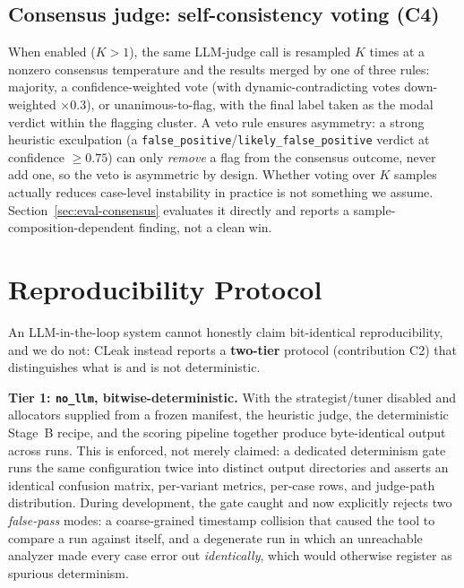 \documentclass[11pt,a4paper]{article}
\begin{document}
\subsection{Consensus judge: self-consistency voting (C4)}

When enabled ($K>1$), the same LLM-judge call is resampled $K$ times at a
nonzero consensus temperature and the results merged by one of three rules:
majority, a confidence-weighted vote (with dynamic-contradicting votes
down-weighted $\times 0.3$), or unanimous-to-flag, with the final label
taken as the modal verdict within the flagging cluster. A veto rule
ensures asymmetry: a strong heuristic exculpation (a
\texttt{false\_positive}/\texttt{likely\_false\_positive} verdict at
confidence $\geq 0.75$) can only \emph{remove} a flag from the consensus
outcome, never add one, so the veto is asymmetric by design. Whether
voting over $K$ samples actually reduces case-level instability in
practice is not something we assume. Section~\ref{sec:eval-consensus}
evaluates it directly and reports a sample-composition-dependent finding,
not a clean win.

\section{Reproducibility Protocol}
\label{sec:reproducibility}

An LLM-in-the-loop system cannot honestly claim bit-identical
reproducibility, and we do not: CLeak instead reports a
\textbf{two-tier} protocol (contribution C2) that distinguishes what is
and is not deterministic.

\textbf{Tier 1: \texttt{no\_llm}, bitwise-deterministic.} With the
strategist/tuner disabled and allocators supplied from a frozen manifest,
the heuristic judge, the deterministic Stage~B recipe, and the scoring
pipeline together produce byte-identical output across runs. This is
enforced, not merely claimed: a dedicated determinism gate runs the same
configuration twice into distinct output directories and asserts an
identical confusion matrix, per-variant metrics, per-case rows, and
judge-path distribution. During development, the gate caught and now
explicitly rejects two \emph{false-pass} modes: a coarse-grained timestamp
collision that caused the tool to compare a run against itself, and a
degenerate run in which an unreachable analyzer made every case error out
\emph{identically}, which would otherwise register as spurious
determinism.
\end{document}
